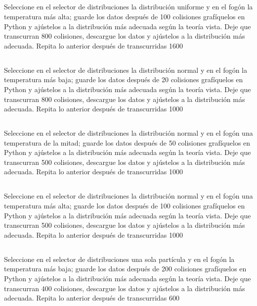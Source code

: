 \documentclass[11pt]{article}
\begin{document}
\subsection{}
Seleccione en el selector de distribuciones la distribución uniforme y en el fogón la temperatura más alta; guarde los datos después de 100 colisiones grafíquelos en Python y ajústelos a la distribución más adecuada según la teoría vista. Deje que transcurran 800 colisiones, descargue los datos y ajústelos a la distribución más adecuada. Repita lo anterior después de transcurridas 1600

\subsection{}
Seleccione en el selector de distribuciones la distribución normal y en el fogón la temperatura más baja; guarde los datos después de 20 colisiones grafíquelos en Python y ajústelos a la distribución más adecuada según la teoría vista. Deje que transcurran 800 colisiones, descargue los datos y ajústelos a la distribución más adecuada. Repita lo anterior después de transcurridas 1000

\subsection{}
Seleccione en el selector de distribuciones la distribución normal y en el fogón una temperatura de la mitad; guarde los datos después de 50 colisiones grafíquelos en Python y ajústelos a la distribución más adecuada según la teoría vista. Deje que transcurran 500 colisiones, descargue los datos y ajústelos a la distribución más adecuada. Repita lo anterior después de transcurridas 1000

\subsection{}
Seleccione en el selector de distribuciones la distribución normal y en el fogón una temperatura más alta; guarde los datos después de 100 colisiones grafíquelos en Python y ajústelos a la distribución más adecuada según la teoría vista. Deje que transcurran 500 colisiones, descargue los datos y ajústelos a la distribución más adecuada. Repita lo anterior después de transcurridas 1000

\subsection{}
Seleccione en el selector de distribuciones una sola partícula y en el fogón la temperatura más baja; guarde los datos después de 200 colisiones grafíquelos en Python y ajústelos a la distribución más adecuada según la teoría vista. Deje que transcurran 400 colisiones, descargue los datos y ajústelos a la distribución más adecuada. Repita lo anterior después de transcurridas 600
\end{document}
